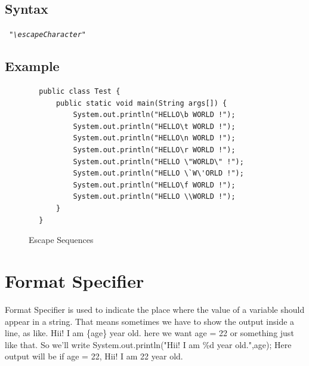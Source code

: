 \documentclass[A4 paper,openany]{book}  %
\begin{document}
\subsection{Syntax}
\begin{center}
    \tt{
        \textit{"\textbackslash escapeCharacter"}
    }
\end{center}
% 
%
\subsection{Example}
\begin{center}
    \begin{verbatim}
        public class Test {
            public static void main(String args[]) {
                System.out.println("HELLO\b WORLD !");
                System.out.println("HELLO\t WORLD !");
                System.out.println("HELLO\n WORLD !");
                System.out.println("HELLO\r WORLD !");
                System.out.println("HELLO \"WORLD\" !");
                System.out.println("HELLO \`W\'ORLD !");
                System.out.println("HELLO\f WORLD !");
                System.out.println("HELLO \\WORLD !");
            }
        }
    \end{verbatim}
\end{center}
% 
% 
\begin{figure}[htbp]
    \begin{center}
        \quad\quad\quad\quad{}
        \caption{Escape Sequences\cite{Ref4}\cite{Ref3}}
    \end{center}
\end{figure}
% 
%
\section{Format Specifier}
Format Specifier\cite{Ref5} is used to indicate the place where the value of a variable should appear in a string. That means sometimes we have to show the output inside a line, as like.
Hii! I am \{age\} year old. here we want age = 22 or something just like that. So we'll write  System.out.println("Hii! I am \%d year old.",age); Here output will be if age = 22,
Hii! I am 22 year old.
\end{document}

